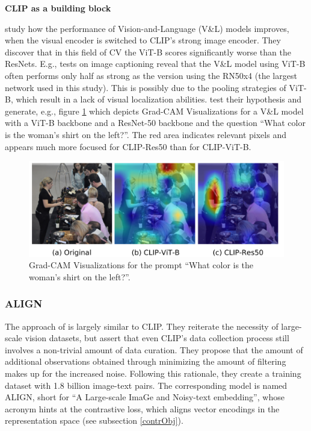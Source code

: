 \documentclass[
]{krantz}
\begin{document}
\textbf{CLIP as a building block}

\citet{shen2021much} study how the performance of Vision-and-Language (V\&L) models improves, when the visual encoder is switched to CLIP's strong image encoder.
They discover that in this field of CV the ViT-B scores significantly worse than the ResNets.
E.g., tests on image captioning reveal that the V\&L model using ViT-B often performs only half as strong as the version using the RN50x4 (the largest network used in this study).
This is possibly due to the pooling strategies of ViT-B, which result in a lack of visual localization abilities.
\citet{shen2021much} test their hypothesis and generate, e.g., figure \ref{fig:attention-ViT} which depicts Grad-CAM Visualizations for a V\&L model with a ViT-B backbone and a ResNet-50 backbone and the question ``What color is the woman's shirt on the left?''.
The red area indicates relevant pixels and appears much more focused for CLIP-Res50 than for CLIP-ViT-B.

\begin{figure}

{\centering \includegraphics[width=1\linewidth]{figures/02-04-text-support-img/attention-of-ViT} 

}

\caption{Grad-CAM Visualizations for the prompt ``What color is the woman's shirt on the left?''.}\label{fig:attention-ViT}
\end{figure}



\hypertarget{align}{%
\subsubsection{ALIGN}\label{align}}

The approach of \citet{jia2021scaling} is largely similar to CLIP.
They reiterate the necessity of large-scale vision datasets, but assert that even CLIP's data collection process still involves a non-trivial amount of data curation.
They propose that the amount of additional observations obtained through minimizing the amount of filtering makes up for the increased noise.
Following this rationale, they create a training dataset with 1.8 billion image-text pairs.
The corresponding model is named ALIGN, short for ``A Large-scale ImaGe and Noisy-text embedding'', whose acronym hints at the contrastive loss, which aligns vector encodings in the representation space (see subsection \ref{contrObj}).
\end{document}
